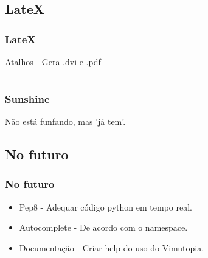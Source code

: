\documentclass[]{beamer}
\begin{document}
\subsection{LateX}

\begin{frame}
    \frametitle{LateX}
        Atalhos -  Gera .dvi e .pdf
\end{frame}


\section[Sunshine]{}
\begin{frame}
    \frametitle{Sunshine}
        Não está funfando, mas 'já tem'.
\end{frame}

\subsection{No futuro}

\begin{frame}
    \frametitle{No futuro}
    \begin{itemize}
        \item<1-> Pep8 - Adequar código python em tempo real.
        \item<2-> Autocomplete - De acordo com o namespace.
        \item<3-> Documentação - Criar help do uso do Vimutopia.
    \end{itemize}
\end{frame}
\end{document}
